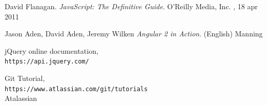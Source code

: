 \documentclass[a4paper]{article}
\begin{document}
\renewcommand{\refname}{Bibliografia}
\begin{thebibliography}{9}
  David Flanagan.
  \textit{JavaScript: The Definitive Guide}. 
  O'Reilly Media, Inc. , 18 apr 2011 
   
  Jason Aden, David Aden, Jeremy Wilken 
  \textit{Angular 2 in Action}. (English) 
  Manning
   
  jQuery online documentation,
  \\\texttt{https://api.jquery.com/}

  Git Tutorial,
  \\\texttt{https://www.atlassian.com/git/tutorials}\\
  Atalassian
  \end{thebibliography}
\end{document}
